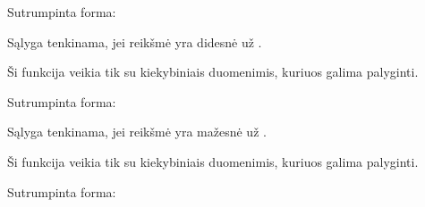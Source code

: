\documentclass[letterpaper,10pt,lithuanian]{sphinxmanual}
\begin{document}
\begin{fulllineitems}
\begin{fulllineitems}
\label{\detokenize{formules:id9}}
\pysigstartsignatures
\pysiglinewithargsret
{}
{\sphinxparamcomma {}}
{}
\pysigstopsignatures
\sphinxAtStartPar
Sutrumpinta forma:

\begin{sphinxVerbatim}[commandchars=\\\{\}]
  
\end{sphinxVerbatim}

\sphinxAtStartPar
Sąlyga tenkinama, jei  reikšmė yra didesnė už .

\sphinxAtStartPar
Ši funkcija veikia tik su kiekybiniais duomenimis, kuriuos galima palyginti.

\end{fulllineitems}


\begin{fulllineitems}
\label{\detokenize{formules:id10}}
\pysigstartsignatures
\pysiglinewithargsret
{}
{\sphinxparamcomma {}}
{}
\pysigstopsignatures
\sphinxAtStartPar
Sutrumpinta forma:

\begin{sphinxVerbatim}[commandchars=\\\{\}]
  
\end{sphinxVerbatim}

\sphinxAtStartPar
Sąlyga tenkinama, jei  reikšmė yra mažesnė už .

\sphinxAtStartPar
Ši funkcija veikia tik su kiekybiniais duomenimis, kuriuos galima palyginti.

\end{fulllineitems}


\begin{fulllineitems}
\label{\detokenize{formules:id11}}
\pysigstartsignatures
\pysiglinewithargsret
{}
{\sphinxparamcomma {}}
{}
\pysigstopsignatures
\sphinxAtStartPar
Sutrumpinta forma:


\end{fulllineitems}
\end{fulllineitems}
\end{document}
